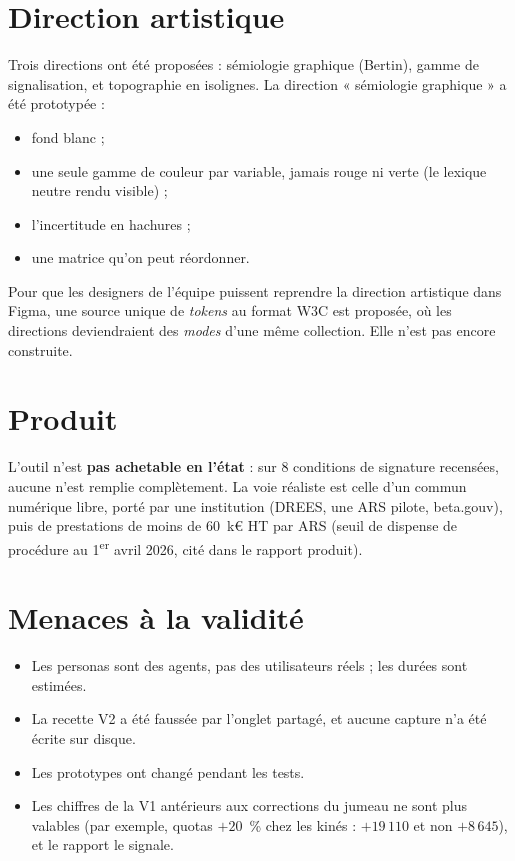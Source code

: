 \section{Direction artistique}
Trois directions ont été proposées : sémiologie graphique (Bertin), gamme de signalisation, et
topographie en isolignes. La direction « sémiologie graphique » a été prototypée :
\begin{itemize}
  \item fond blanc ;
  \item une seule gamme de couleur par variable, jamais rouge ni verte (le lexique neutre rendu
        visible) ;
  \item l'incertitude en hachures ;
  \item une matrice qu'on peut réordonner.
\end{itemize}
Pour que les designers de l'équipe puissent reprendre la direction artistique dans Figma, une
source unique de \emph{tokens} au format W3C est proposée, où les directions deviendraient des
\emph{modes} d'une même collection. Elle n'est pas encore construite.

\section{Produit}
L'outil n'est \textbf{pas achetable en l'état} : sur 8 conditions de signature recensées,
aucune n'est remplie complètement. La voie réaliste est celle d'un commun numérique libre,
porté par une institution (DREES, une ARS pilote, beta.gouv), puis de prestations de moins de
60~k€ HT par ARS (seuil de dispense de procédure au 1\textsuperscript{er} avril 2026, cité
dans le rapport produit).

\section{Menaces à la validité}
\begin{itemize}
  \item Les personas sont des agents, pas des utilisateurs réels ; les durées sont estimées.
  \item La recette V2 a été faussée par l'onglet partagé, et aucune capture n'a été écrite sur
        disque.
  \item Les prototypes ont changé pendant les tests.
  \item Les chiffres de la V1 antérieurs aux corrections du jumeau ne sont plus valables (par
        exemple, quotas $+20$~\% chez les kinés : $+19\,110$ et non $+8\,645$), et le rapport
        le signale.
\end{itemize}
